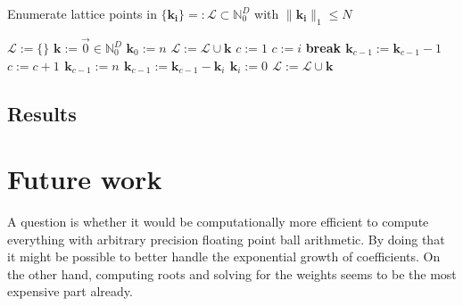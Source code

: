 \documentclass[a4paper,10pt]{article}
\begin{document}
\begin{algorithm}[h!]
  \caption{Enumerate lattice points in $\{\mathbf{k_{i}}\} =: \mathcal{L} \subset \mathbb{N}_{0}^{D}$
    with $\|\mathbf{k_{i}}\|_{1} \leq N$}
  \label{alg:ca_enumerate_lattice_points}
  \begin{algorithmic}
      \State $\mathcal{L} := \{\} $
        \State $\mathbf{k} := \vec{0} \in \mathbb{N}_{0}^{D}$
        \State $\mathbf{k}_{0} := n$
        \State $\mathcal{L} := \mathcal{L} \cup \mathbf{k}$
        \State $c := 1$
              \State $c := i$
                \State \bf{break}
              \EndIf
            \EndFor
            \State $\mathbf{k}_{c-1} := \mathbf{k}_{c-1} - 1$
            \State $c := c +1$
            \State $\mathbf{k}_{c-1} := n$
              \State $\mathbf{k}_{c-1} := \mathbf{k}_{c-1} - \mathbf{k}_{i}$
            \EndFor
                \State $\mathbf{k}_{i} := 0$
              \EndFor
            \EndIf
            \State $\mathcal{L} := \mathcal{L} \cup \mathbf{k}$
          \EndIf
        \EndWhile
      \EndFor
    \EndProcedure
  \end{algorithmic}
\end{algorithm}


\subsection{Results}
















\section{Future work}

A question is whether it would be computationally more efficient to compute
everything with arbitrary precision floating point ball arithmetic. By doing that
it might be possible to better handle the exponential growth of coefficients.
On the other hand, computing roots and solving for the weights seems to be
the most expensive part already.
\end{document}
